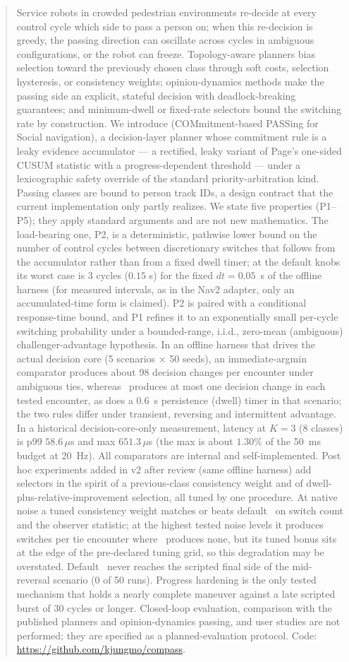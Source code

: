 \begin{abstract}
Service robots in crowded pedestrian environments re-decide at every control cycle which side to pass a person on; when this re-decision is greedy, the passing direction can oscillate across cycles in ambiguous configurations, or the robot can freeze. Topology-aware planners bias selection toward the previously chosen class through soft costs, selection hysteresis, or consistency weights; opinion-dynamics methods make the passing side an explicit, stateful decision with deadlock-breaking guarantees; and minimum-dwell or fixed-rate selectors bound the switching rate by construction. We introduce \emph{\sname} (COMmitment-based PASSing for Social navigation), a decision-layer planner whose commitment rule is a leaky evidence accumulator --- a rectified, leaky variant of Page's one-sided CUSUM statistic with a progress-dependent threshold --- under a lexicographic safety override of the standard priority-arbitration kind. Passing classes are bound to person track IDs, a design contract that the current implementation only partly realizes. We state five properties (P1--P5); they apply standard arguments and are not new mathematics. The load-bearing one, P2, is a deterministic, pathwise lower bound on the number of control cycles between discretionary switches that follows from the accumulator rather than from a fixed dwell timer; at the default knobs its worst case is $3$ cycles ($0.15$ s) for the fixed $dt=0.05$~s of the offline harness (for measured intervals, as in the Nav2 adapter, only an accumulated-time form is claimed). P2 is paired with a conditional response-time bound, and P1 refines it to an exponentially small per-cycle switching probability under a bounded-range, i.i.d., zero-mean (ambiguous) challenger-advantage hypothesis. In an offline harness that drives the actual decision core (5 scenarios $\times$ 50 seeds), an immediate-argmin comparator produces about 98 decision changes per encounter under ambiguous ties, whereas \sname\ produces at most one decision change in each tested encounter, as does a 0.6~s persistence (dwell) timer in that scenario; the two rules differ under transient, reversing and intermittent advantage. In a historical decision-core-only measurement, latency at $K=3$ (8 classes) is p99 $58.6\,\mu$s and max $651.3\,\mu$s (the max is about $1.30\%$ of the 50~ms budget at 20~Hz). All comparators are internal and self-implemented. Post hoc experiments added in v2 after review (same offline harness) add selectors in the spirit of a previous-class consistency weight and of dwell-plus-relative-improvement selection, all tuned by one procedure. At native noise a tuned consistency weight matches or beats default \sname\ on switch count and the observer statistic; at the highest tested noise levels it produces switches per tie encounter where \sname\ produces none, but its tuned bonus sits at the edge of the pre-declared tuning grid, so this degradation may be overstated. Default \sname\ never reaches the scripted final side of the mid-reversal scenario (0 of 50 runs). Progress hardening is the only tested mechanism that holds a nearly complete maneuver against a late scripted burst of 30 cycles or longer. Closed-loop evaluation, comparison with the published planners and opinion-dynamics passing, and user studies are not performed; they are specified as a planned-evaluation protocol. Code: \url{https://github.com/kjungmo/compass}.
\end{abstract}
